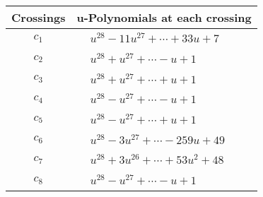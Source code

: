 \documentclass[1p]{elsarticle_modified}
\theoremstyle{definition}
\begin{document}
\begin{tabular}{m{50pt}|m{274pt}}
Crossings & \hspace{64pt}u-Polynomials at each crossing \\
\hline $$\begin{aligned}c_{1}\end{aligned}$$&$\begin{aligned}
&u^{28}-11 u^{27}+\cdots+33 u+7
\end{aligned}$\\
\hline $$\begin{aligned}c_{2}\end{aligned}$$&$\begin{aligned}
&u^{28}+u^{27}+\cdots- u+1
\end{aligned}$\\
\hline $$\begin{aligned}c_{3}\end{aligned}$$&$\begin{aligned}
&u^{28}+u^{27}+\cdots+u+1
\end{aligned}$\\
\hline $$\begin{aligned}c_{4}\end{aligned}$$&$\begin{aligned}
&u^{28}- u^{27}+\cdots- u+1
\end{aligned}$\\
\hline $$\begin{aligned}c_{5}\end{aligned}$$&$\begin{aligned}
&u^{28}- u^{27}+\cdots+u+1
\end{aligned}$\\
\hline $$\begin{aligned}c_{6}\end{aligned}$$&$\begin{aligned}
&u^{28}-3 u^{27}+\cdots-259 u+49
\end{aligned}$\\
\hline $$\begin{aligned}c_{7}\end{aligned}$$&$\begin{aligned}
&u^{28}+3 u^{26}+\cdots+53 u^2+48
\end{aligned}$\\
\hline $$\begin{aligned}c_{8}\end{aligned}$$&$\begin{aligned}
&u^{28}- u^{27}+\cdots- u+1
\end{aligned}$\\

\end{tabular}
\end{document}
